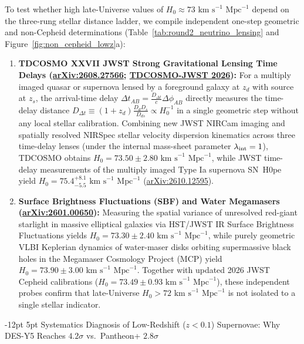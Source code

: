 \documentclass[11pt,letterpaper]{article}
\makeatletter
\renewcommand{\subsection}{\@startsection{subsection}{2}{\z@}%
  {-12pt \@plus -3pt \@minus -1pt}%
  {5pt \@plus 1pt}%
  {\normalfont\large\bfseries\color{tealaccent}}}
\makeatother
\begin{document}
To test whether high late-Universe values of $H_0 \approx 73\text{ km s}^{-1}\text{ Mpc}^{-1}$ depend on the three-rung stellar distance ladder, we compile independent one-step geometric and non-Cepheid determinations (Table~\ref{tab:round2_neutrino_lensing} and Figure~\ref{fig:non_cepheid_lowz}a):
\begin{enumerate}
    \setlength{\itemsep}{3pt}
    \item \textbf{TDCOSMO XXVII JWST Strong Gravitational Lensing Time Delays (\href{https://www.alphaxiv.org/ja/abs/2608.27566}{arXiv:2608.27566}; \href{https://universe-origins.dk/sloth/?p=714}{TDCOSMO-JWST 2026}):} For a multiply imaged quasar or supernova lensed by a foreground galaxy at $z_d$ with source at $z_s$, the arrival-time delay $\Delta t_{AB} = \frac{D_{\Delta t}}{c} \Delta\phi_{AB}$ directly measures the time-delay distance $D_{\Delta t} \equiv (1+z_d)\frac{D_d D_s}{D_{ds}} \propto H_0^{-1}$ in a single geometric step without any local stellar calibration. Combining new JWST NIRCam imaging and spatially resolved NIRSpec stellar velocity dispersion kinematics across three time-delay lenses (under the internal mass-sheet parameter $\lambda_{\rm int} = 1$), TDCOSMO obtains $H_0 = 73.50 \pm 2.80\text{ km s}^{-1}\text{ Mpc}^{-1}$, while JWST time-delay measurements of the multiply imaged Type Ia supernova SN~H0pe yield $H_0 = 75.4^{+8.1}_{-5.5}\text{ km s}^{-1}\text{ Mpc}^{-1}$ (\href{https://arxiv.org/html/2610.12595v1}{arXiv:2610.12595}).
    \item \textbf{Surface Brightness Fluctuations (SBF) and Water Megamasers (\href{https://arxiv.org/pdf/2601.00650}{arXiv:2601.00650}):} Measuring the spatial variance of unresolved red-giant starlight in massive elliptical galaxies via HST/JWST IR Surface Brightness Fluctuations yields $H_0 = 73.30 \pm 2.40\text{ km s}^{-1}\text{ Mpc}^{-1}$, while purely geometric VLBI Keplerian dynamics of water-maser disks orbiting supermassive black holes in the Megamaser Cosmology Project (MCP) yield $H_0 = 73.90 \pm 3.00\text{ km s}^{-1}\text{ Mpc}^{-1}$. Together with updated 2026 JWST Cepheid calibrations ($H_0 = 73.49 \pm 0.93\text{ km s}^{-1}\text{ Mpc}^{-1}$), these independent probes confirm that late-Universe $H_0 > 72\text{ km s}^{-1}\text{ Mpc}^{-1}$ is not isolated to a single stellar indicator.
\end{enumerate}

\subsection{Systematics Diagnosis of Low-Redshift ($z < 0.1$) Supernovae: Why DES-Y5 Reaches $4.2\sigma$ vs.\ Pantheon+ $2.8\sigma$}
\end{document}
